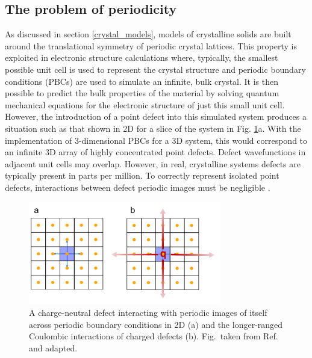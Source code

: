 \documentclass[11pt, twoside]{report}
\begin{document}
\subsection{The problem of periodicity}
As discussed in section \ref{crystal_models}, models of crystalline solids are built around the translational symmetry of periodic crystal lattices. This property is exploited in electronic structure calculations where, typically, the smallest possible unit cell is used to represent the crystal structure and periodic boundary conditions (PBCs) are used to simulate an infinite, bulk crystal. It is then possible to predict the bulk properties of the material by solving quantum mechanical equations for the electronic structure of just this small unit cell. However, the introduction of a point defect into this simulated system produces a situation such as that shown in 2D for a slice of the system in Fig. \ref{defect_PBCs}a. With the implementation of 3-dimensional PBCs for a 3D system, this would correspond to an infinite 3D array of highly concentrated point defects. Defect wavefunctions in adjacent unit cells may overlap. However, in real, crystalline systems defects are typically present in parts per million.  To correctly represent isolated point defects, interactions between defect periodic images must be negligible \cite{freysoldt_rev}.

\begin{figure}[h!]
  \centering
    \includegraphics[width=0.75\textwidth]{figures/ase_defects.png}
    \caption[A charge-neutral defect interacting with periodic images of itself across periodic boundary conditions in 2D (a) and the longer-ranged Coulombic interactions of charged defects (b).]{A charge-neutral defect interacting with periodic images of itself across periodic boundary conditions in 2D (a) and the longer-ranged Coulombic interactions of charged defects (b). Fig.~taken from Ref.~ and adapted.}
  \label{defect_PBCs}
\end{figure}
\end{document}
